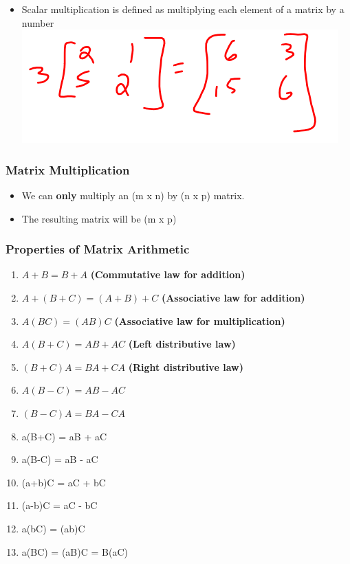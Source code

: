 \documentclass[
  letterpaper,
  DIV=11,
  numbers=noendperiod]{scrartcl}
\providecommand{\tightlist}{%
  \setlength{\itemsep}{0pt}\setlength{\parskip}{0pt}}\usepackage{longtable,booktabs,array}
\begin{document}
\begin{itemize}
\tightlist
\item
  Scalar multiplication is defined as multiplying each element of a
  matrix by a number \includegraphics{img/scalar.png}
\end{itemize}

\hypertarget{matrix-multiplication}{%
\subsubsection{Matrix Multiplication}\label{matrix-multiplication}}

\begin{itemize}
\tightlist
\item
  We can \textbf{only} multiply an (m x n) by (n x p) matrix.
\item
  The resulting matrix will be (m x p)
\end{itemize}

\hypertarget{properties-of-matrix-arithmetic}{%
\subsubsection{Properties of Matrix
Arithmetic}\label{properties-of-matrix-arithmetic}}

\begin{enumerate}
\def\labelenumi{(\alph{enumi})}
\tightlist
\item
  \(A + B = B + A\) \textbf{(Commutative law for addition)}
\item
  \(A + (B + C) = (A + B) + C\) \textbf{(Associative law for addition)}
\item
  \(A(BC) = (AB)C\) \textbf{(Associative law for multiplication)}
\item
  \(A(B+C) = AB + AC\) \textbf{(Left distributive law)}
\item
  \((B+C)A = BA + CA\) \textbf{(Right distributive law)}
\item
  \(A(B-C) = AB - AC\)
\item
  \((B-C)A = BA - CA\)
\item
  a(B+C) = aB + aC
\item
  a(B-C) = aB - aC
\item
  (a+b)C = aC + bC
\item
  (a-b)C = aC - bC
\item
  a(bC) = (ab)C
\item
  a(BC) = (aB)C = B(aC)
\end{enumerate}
\end{document}
